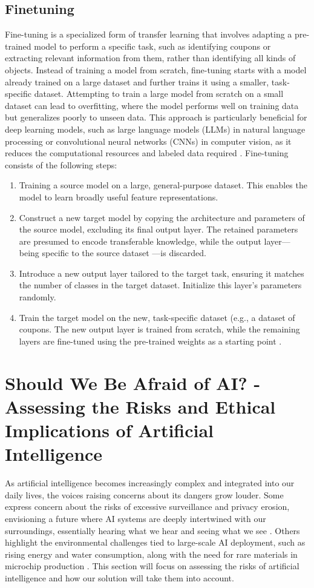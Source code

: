 \documentclass[licencjacka,en]{pracamgr}
\begin{document}
\subsection{Finetuning}
Fine-tuning is a specialized form of transfer learning that involves adapting a pre-trained model to perform a specific task, such as identifying coupons or extracting relevant information from them, rather than identifying all kinds of objects. Instead of training a model from scratch, fine-tuning starts with a model already trained on a large dataset and further trains it using a smaller, task-specific dataset. Attempting to train a large model from scratch on a small dataset can lead to overfitting, where the model performs well on training data but generalizes poorly to unseen data. This approach is particularly beneficial for deep learning models, such as large language models (LLMs) in natural language processing or convolutional neural networks (CNNs) in computer vision, as it reduces the computational resources and labeled data required \cite{ibm_finetuning}.
Fine-tuning consists of the following steps:
\begin{enumerate}
	\item Training a source model on a large, general-purpose dataset. This enables the model to learn broadly useful feature representations.
	\item Construct a new target model by copying the architecture and parameters of the source model, excluding its final output layer. The retained parameters are presumed to encode transferable knowledge, while the output layer—being specific to the source dataset —is discarded.
	\item Introduce a new output layer tailored to the target task, ensuring it matches the number of classes in the target dataset. Initialize this layer’s parameters randomly.
	\item Train the target model on the new, task-specific dataset (e.g., a dataset of coupons. The new output layer is trained from scratch, while the remaining layers are fine-tuned using the pre-trained weights as a starting point \cite{finetune_cool_image}.
\end{enumerate}

\section{Should We Be Afraid of AI? - Assessing the Risks and Ethical Implications of Artificial Intelligence}

As artificial intelligence becomes increasingly complex and integrated into our daily lives, the voices raising concerns about its dangers grow louder. Some express concern about the risks of excessive surveillance and privacy erosion, envisioning a future where AI systems are deeply intertwined with our surroundings, essentially hearing what we hear and seeing what we see \cite{sroka_vid}. Others highlight the environmental challenges tied to large-scale AI deployment, such as rising energy and water consumption, along with the need for rare materials in microchip production \cite{ai_env_concerns}. This section will focus on assessing the risks of artificial intelligence and how our solution will take them into account.
\end{document}
